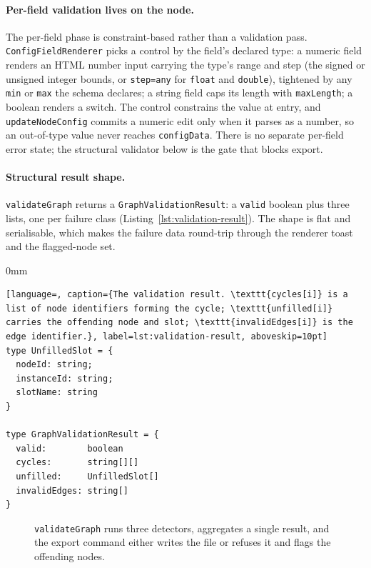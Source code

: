 \paragraph{Per-field validation lives on the node.}
The per-field phase is constraint-based rather than a validation pass. \texttt{ConfigFieldRenderer} picks a control by the field's declared type: a numeric field renders an HTML number input carrying the type's range and step (the signed or unsigned integer bounds, or \texttt{step=any} for \texttt{float} and \texttt{double}), tightened by any \texttt{min} or \texttt{max} the schema declares; a string field caps its length with \texttt{maxLength}; a boolean renders a switch. The control constrains the value at entry, and \texttt{updateNodeConfig} commits a numeric edit only when it parses as a number, so an out-of-type value never reaches \texttt{configData}. There is no separate per-field error state; the structural validator below is the gate that blocks export.

\paragraph{Structural result shape.}
\texttt{validateGraph} returns a \texttt{GraphValidationResult}: a \texttt{valid} boolean plus three lists, one per failure class (Listing~\ref{lst:validation-result}). The shape is flat and serialisable, which makes the failure data round-trip through the renderer toast and the flagged-node set.

\begin{addmargin}[0mm]{0mm}
\begin{lstlisting}[language=, caption={The validation result. \texttt{cycles[i]} is a list of node identifiers forming the cycle; \texttt{unfilled[i]} carries the offending node and slot; \texttt{invalidEdges[i]} is the edge identifier.}, label=lst:validation-result, aboveskip=10pt]
type UnfilledSlot = { 
  nodeId: string; 
  instanceId: string; 
  slotName: string 
}

type GraphValidationResult = {
  valid:        boolean
  cycles:       string[][]
  unfilled:     UnfilledSlot[]
  invalidEdges: string[]
}
\end{lstlisting}
\end{addmargin}

\begin{figure}[H]
    \centering
    \resizebox{0.8\textwidth}{!}{
        
    }
    \caption[How the structural validator composes.]{\texttt{validateGraph} runs three detectors, aggregates a single result, and the export command either writes the file or refuses it and flags the offending nodes.}
    \label{fig:validation-impl}
\end{figure}

